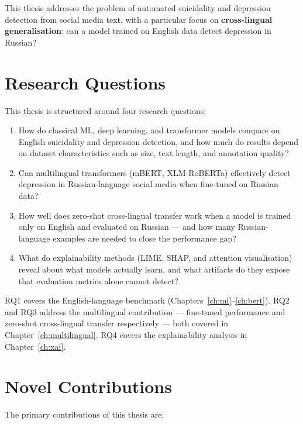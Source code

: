 \documentclass[12pt, a4paper, oneside]{report}
\begin{document}
This thesis addresses the problem of automated suicidality and depression detection from social media text, with a particular focus on \textbf{cross-lingual generalisation}: can a model trained on English data detect depression in Russian?

\section{Research Questions}

This thesis is structured around four research questions:

\begin{enumerate}[label=\textbf{RQ\arabic*.}]
    \item How do classical ML, deep learning, and transformer models compare on English suicidality and depression detection, and how much do results depend on dataset characteristics such as size, text length, and annotation quality?
    \item Can multilingual transformers (mBERT, XLM-RoBERTa) effectively detect depression in Russian-language social media when fine-tuned on Russian data?
    \item How well does zero-shot cross-lingual transfer work when a model is trained only on English and evaluated on Russian — and how many Russian-language examples are needed to close the performance gap?
    \item What do explainability methods (LIME, SHAP, and attention visualisation) reveal about what models actually learn, and what artifacts do they expose that evaluation metrics alone cannot detect?
\end{enumerate}

RQ1 covers the English-language benchmark (Chapters~\ref{ch:ml}--\ref{ch:bert}). RQ2 and RQ3 address the multilingual contribution — fine-tuned performance and zero-shot cross-lingual transfer respectively — both covered in Chapter~\ref{ch:multilingual}. RQ4 covers the explainability analysis in Chapter~\ref{ch:xai}.

\section{Novel Contributions}

The primary contributions of this thesis are:
\end{document}
